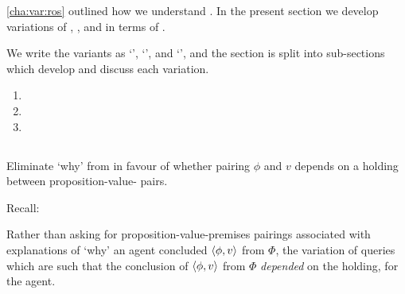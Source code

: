 \begin{note}
  \autoref{cha:var:ros} outlined how we understand .
  In the present section we develop variations of \qWhy{}, \qHow{}, and \issueInclusion{} in terms of \ros{}.

  We write the variants as `\qWhyV{}', `\qHowV{}', and `\issueConstraint{}', and the section is split into sub-sections which develop and discuss each variation.

  \begin{enumerate}[label=]
  \item
  \item
  \item
  \end{enumerate}

\end{note}

\subsection{\qWhyV{}}
\label{cha:var:sec:vars:qwhyvnp}

\begin{note}
  Eliminate `why' from \qWhy{} in favour of whether pairing \(\phi\) and \(v\) depends on a \ros{} holding between proposition-value-\pool{} pairs.

  Recall:
  \begin{quote}%
    \vspace{-1.5\baselineskip}%
    \questionWhyBasic*
  \end{quote}

  Rather than asking for proposition-value-premises pairings associated with explanations of `why' an agent concluded \(\langle \phi, v \rangle\) from \(\Phi\), the variation of \qWhy{} queries which  are such that the conclusion of \(\langle \phi, v \rangle\) from \(\Phi\) \emph{depended} on the  holding, for the agent.
  \end{note}


